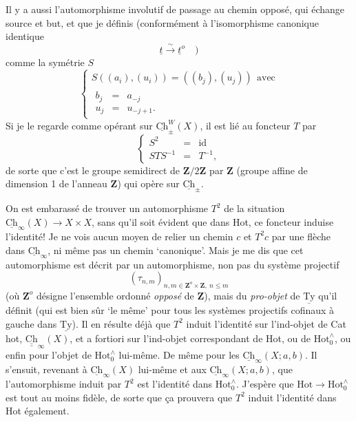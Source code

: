 \documentclass[11pt]{article}
\newcommand{\msp}[1]{\marginpar{\footnotesize [#1]}}
\newcommand{\Ch}{\underline{\mathrm{Ch}}}
\newcommand{\Ty}{\underline{\mathrm{Ty}}}
\begin{document}
Il y a aussi l'automorphisme involutif de passage au chemin opposé, qui échange source et but, et que je définis (conformément à l'isomorphisme canonique identique
\[
\underline{t} \xrightarrow{\sim} \underline{t}^o \quad )
\]
comme la symétrie $S$
\[
\left\{ \begin{array}{l}
S((a_i),(u_i)) = ((b_j),(u_j)) \ \ \text{avec} \\[1ex]
\begin{array}{lcl} b_j & = & a_{-j} \\[1ex] u_j & = & u_{-j+1}. \end{array}
\end{array} \right.
\]
Si je le regarde comme opérant sur $\Ch^{W}_{\pm}(X)$, il est lié au foncteur $T$ par
\[
\left\{ \begin{array}{rcl}
S^2 & = & \mathrm{id} \\[1ex]
STS^{-1} & = & T^{-1},
\end{array} \right.
\]
de sorte que c'est le groupe semidirect de $\mathbf{Z}/2\mathbf{Z}$ par $\mathbf{Z}$ (groupe affine de dimension 1 de l'anneau $\mathbf{Z}$) qui opère sur $\Ch_{\pm}$.

\msp{page 149}
On est embarassé de trouver un automorphisme $T^2$ de la situation $\Ch_{\infty}(X) \longrightarrow X \times X$, sans qu'il soit évident que dans Hot, ce foncteur induise l'identité! Je ne vois aucun moyen de relier un chemin $c$ et $T^2 c$ par une flèche dans $\Ch_{\infty}$, ni même pas un chemin `canonique'. Mais je me dis que cet automorphisme est décrit par un automorphisme, non pas du système projectif %
\[
(\tau_{n,m})_{n,m \in \mathbf{Z}^o \times \mathbf{Z},\ n \leq m}
\]
(où $\mathbf{Z}^o$ désigne l'ensemble ordonné \textit{opposé} de $\mathbf{Z}$), mais du \textit{pro-objet} de $\Ty$ qu'il définit (qui est bien sûr `le même' pour tous les systèmes projectifs cofinaux à gauche dans $\Ty$). Il en résulte déjà que $T^2$ induit l'identité sur l'ind-objet de Cat\,hot, $\underline{\underline{\mathrm{Ch}}}_{\infty}(X)$, et a fortiori sur l'ind-objet correspondant de Hot, ou de $\mathrm{Hot}^{\wedge}_{0}$, ou enfin pour l'objet de $\mathrm{Hot}^{\wedge}_{0}$ lui-même. De même pour les $\Ch_{\infty}(X; a, b)$. Il s'ensuit, revenant à $\Ch_{\infty}(X)$ lui-même et aux $\Ch_{\infty}(X; a, b)$, que l'automorphisme induit par $T^2$ est l'identité dans $\mathrm{Hot}^{\wedge}_{0}$. J'espère que $\mathrm{Hot} \longrightarrow \mathrm{Hot}^{\wedge}_{0}$ est
\msp{page 150}
tout au moins fidèle, de sorte que ça prouvera que $T^2$ induit l'identité dans Hot également.
\end{document}
